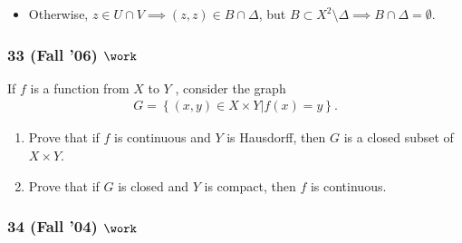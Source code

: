 \begin{solution}
\begin{itemize}
  \begin{itemize}
  \tightlist
  \item
    Otherwise, \(z\in U\cap V \implies (z, z) \in B\cap\Delta\), but
    \(B \subset X^2\setminus \Delta \implies B \cap\Delta = \emptyset\).
  \end{itemize}
\end{itemize}

\end{solution}

\hypertarget{fall-06-work}{%
\subsubsection{\texorpdfstring{33 (Fall '06)
\(\work\)}{33 (Fall '06) \textbackslash work}}\label{fall-06-work}}

\begin{problem}[?]

If \(f\) is a function from \(X\) to \(Y\) , consider the graph
\begin{align*}
G = \left\{{(x, y) \in X \times Y \mathrel{\Big|}f (x) = y}\right\}
.\end{align*}

\begin{enumerate}
\def\labelenumi{\alph{enumi}.}
\item
  Prove that if \(f\) is continuous and \(Y\) is Hausdorff, then \(G\)
  is a closed subset of \(X \times Y\).
\item
  Prove that if \(G\) is closed and \(Y\) is compact, then \(f\) is
  continuous.
\end{enumerate}

\end{problem}

\hypertarget{fall-04-work}{%
\subsubsection{\texorpdfstring{34 (Fall '04)
\(\work\)}{34 (Fall '04) \textbackslash work}}\label{fall-04-work}}


